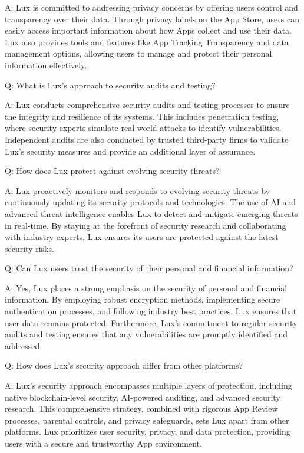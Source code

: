 \documentclass[11pt]{article}
\begin{document}
A: Lux is committed to addressing privacy concerns by offering users control and transparency over their data. Through privacy labels on the App Store, users can easily access important information about how Apps collect and use their data. Lux also provides tools and features like App Tracking Transparency and data management options, allowing users to manage and protect their personal information effectively.


Q: What is Lux's approach to security audits and testing?


A: Lux conducts comprehensive security audits and testing processes to ensure the integrity and resilience of its systems. This includes penetration testing, where security experts simulate real-world attacks to identify vulnerabilities. Independent audits are also conducted by trusted third-party firms to validate Lux's security measures and provide an additional layer of assurance.


Q: How does Lux protect against evolving security threats?


A: Lux proactively monitors and responds to evolving security threats by continuously updating its security protocols and technologies. The use of AI and advanced threat intelligence enables Lux to detect and mitigate emerging threats in real-time. By staying at the forefront of security research and collaborating with industry experts, Lux ensures its users are protected against the latest security risks.


Q: Can Lux users trust the security of their personal and financial information?


A: Yes, Lux places a strong emphasis on the security of personal and financial information. By employing robust encryption methods, implementing secure authentication processes, and following industry best practices, Lux ensures that user data remains protected. Furthermore, Lux's commitment to regular security audits and testing ensures that any vulnerabilities are promptly identified and addressed.


Q: How does Lux's security approach differ from other platforms?


A: Lux's security approach encompasses multiple layers of protection, including native blockchain-level security, AI-powered auditing, and advanced security research. This comprehensive strategy, combined with rigorous App Review processes, parental controls, and privacy safeguards, sets Lux apart from other platforms. Lux prioritizes user security, privacy, and data protection, providing users with a secure and trustworthy App environment.
\end{document}
